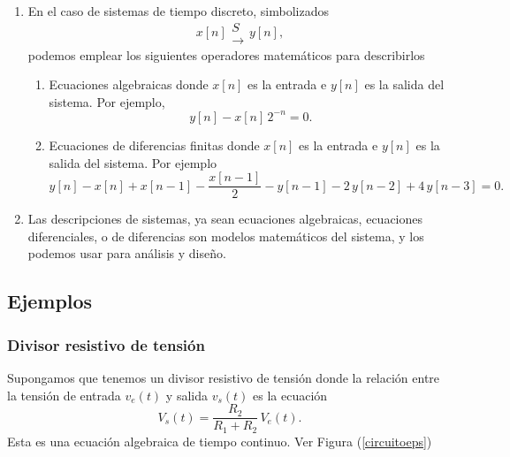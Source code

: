 \begin{enumerate}
\begin{enumerate}
    \item Ecuaciones diferenciales donde $x(t)$ es la entrada e $y(t)$ es la salida del sistema. Por ejemplo,
      \begin{equation}
        \frac{d y(t)}{dt} + 2 \, y(t) - x(t) = 0.
      \end{equation}
    \end{enumerate}
        
  \item En el caso de sistemas de tiempo discreto, simbolizados
    \begin{equation}
      x\left[ n\right] 
      \begin{array}{l}
        S               \\ 
        \rightarrow
      \end{array}
      y\left[ n\right] ,
    \end{equation}
    podemos emplear los siguientes operadores matem\'{a}ticos para describirlos
    \begin{enumerate}
    \item Ecuaciones algebraicas
      donde $x[n]$ es la entrada e $y[n]$ es la salida del sistema. Por ejemplo,
      \begin{equation}
         y[n] - x[n] \, 2^{-n} = 0.
      \end{equation}
                                
    \item Ecuaciones de diferencias finitas donde $x[n]$ es la entrada e $y[n]$ es la salida del sistema. Por ejemplo
      \begin{equation}
          y[n] - x[n] + x[n-1] - \frac{x[n-1]}{2} - y[n-1] - 2 \, y[n-2] + 4 \, y[n-3] = 0.
      \end{equation}
    \end{enumerate}

\item Las descripciones de sistemas, ya sean ecuaciones algebraicas,
  ecuaciones diferenciales, o de diferencias son modelos
  matem\'{a}ticos del sistema, y los podemos usar para an\'{a}lisis y
  dise\~{n}o.

\end{enumerate}

\subsection{Ejemplos}

\subsubsection{Divisor resistivo de tensi\'{o}n}
Supongamos que tenemos un divisor resistivo de tensi\'{o}n donde la
relaci\'{o}n entre la tensi\'{o}n de entrada $v_{e} \left( t \right)$
y salida $v_{s} \left( t \right)$ es la ecuaci\'{o}n
\begin{equation}
  V_{s}\left( t \right) = \frac{R_{2}}{R_{1} + R_{2}} \, V_{e}\left( t \right).      \label{divires}
\end{equation}
Esta es una ecuaci\'{o}n algebraica de tiempo continuo.  Ver Figura
(\ref{circuitoeps})

